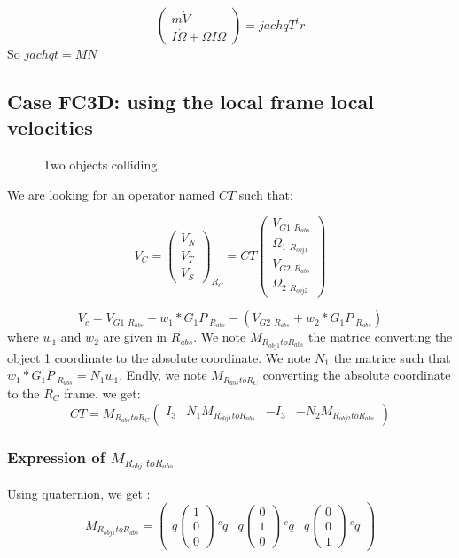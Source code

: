 \[\left(\begin{array}{c}m \dot V\\I \dot \Omega + \Omega I \Omega \end{array}\right)=jachqT^t r\]
So $jachqt=MN$

\subsection{Case FC3D: using the local frame local velocities}
\begin{figure}[h]
  \centering
   \scalebox{0.7}{
  
  }
  \caption{Two objects colliding.}
  \label{figCase}
\end{figure}


We are looking for an operator named $CT$ such that:

\[V_C=\left(\begin{array}{c} V_N \\ V_T \\ V_S \end{array}\right)_{R_{C}}=CT \left(\begin{array}{c} V_{G1}~_{R_{abs}} \\ \Omega_1~_{R_{obj1}} \\ V_{G2}~_{R_{abs}}\\ \Omega_2~_{R_{obj2}} \end{array}\right)\]

\[V_c=V_{G1}~_{R_{abs}} + w_1 * G_1P~_{R_{abs}} -(V_{G2}~_{R_{abs}} + w_2 * G_1P~_{R_{abs}})\]
where $w_1$ and $w_2$ are given in $R_{abs}$. We note $M_{R_{obj1}toR_{abs}}$ the matrice converting the object 1 coordinate to the absolute coordinate. We note $N_1$ the matrice such that $w_1*G_1P~_{R_{abs}} = N_1 w_1$. Endly, we note $M_{R_{abs}toR_C}$ converting the absolute coordinate to the $R_C$ frame.
we get:
\[CT= M_{R_{abs}toR_C}   \left(\begin{array}{cccc} I_3 & N_1M_{R_{obj1}toR_{abs}} & -I_3 & -N_2M_{R_{obj2}toR_{abs}} \end{array}\right)\]

\subsubsection{Expression of $M_{R_{obj1}toR_{abs}}$}
Using quaternion, we get :
\[M_{R_{obj1}toR_{abs}} = \left(\begin{array}{ccc} q \left(\begin{array}{c}1\\0\\0 \end{array}\right)~^cq & q \left(\begin{array}{c}  0\\1\\0 \end{array}\right)~ ^cq & q \left(\begin{array}{c}  0\\0\\1 \end{array}\right)~ ^cq  \end{array}\right)\]

